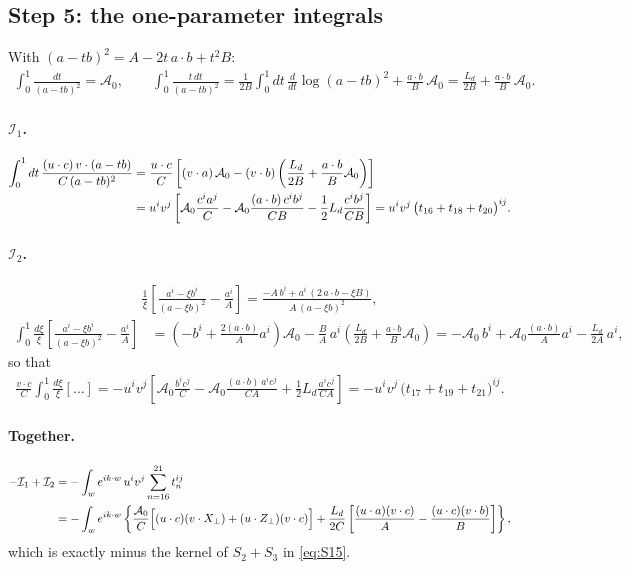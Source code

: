 \documentclass[10pt]{article}
\numberwithin{equation}{section}
\begin{document}
\subsection{Step 5: the one-parameter integrals}
With $(a-tb)^{2}=A-2t\,a\cdot b+t^{2}B$:
\begin{align}
\int_{0}^{1}\frac{dt}{(a-tb)^{2}}=\mathcal{A}_{0},\qquad
\int_{0}^{1}\frac{t\,dt}{(a-tb)^{2}}=\frac{1}{2B}\int_{0}^{1}dt\,\frac{d}{dt}\log(a-tb)^{2}+\frac{a\cdot b}{B}\,\mathcal{A}_{0}=\frac{L_{d}}{2B}+\frac{a\cdot b}{B}\,\mathcal{A}_{0}.
\end{align}
\paragraph{$\mathcal{I}_{1}$.}
\begin{align}
\int_{0}^{1}dt\,\frac{(u\cdot c)\,v\cdot(a-tb)}{C\,(a-tb)^{2}}
&=\frac{u\cdot c}{C}\left[(v\cdot a)\,\mathcal{A}_{0}-(v\cdot b)\left(\frac{L_{d}}{2B}+\frac{a\cdot b}{B}\mathcal{A}_{0}\right)\right]\notag\\
&=u^{i}v^{j}\left[\mathcal{A}_{0}\frac{c^{i}a^{j}}{C}-\mathcal{A}_{0}\frac{(a\cdot b)\,c^{i}b^{j}}{CB}-\frac12L_{d}\frac{c^{i}b^{j}}{CB}\right]=u^{i}v^{j}\,\big(t_{16}+t_{18}+t_{20}\big)^{ij}.
\end{align}
\paragraph{$\mathcal{I}_{2}$.}
\begin{align}
\frac1\xi\left[\frac{a^{i}-\xi b^{i}}{(a-\xi b)^{2}}-\frac{a^{i}}{A}\right]
=\frac{-A\,b^{i}+a^{i}\,(2\,a\cdot b-\xi B)}{A\,(a-\xi b)^{2}},
\end{align}
\begin{align}
\int_{0}^{1}\frac{d\xi}{\xi}\left[\frac{a^{i}-\xi b^{i}}{(a-\xi b)^{2}}-\frac{a^{i}}{A}\right]
&=\left(-b^{i}+\frac{2(a\cdot b)}{A}a^{i}\right)\mathcal{A}_{0}-\frac{B}{A}\,a^{i}\left(\frac{L_{d}}{2B}+\frac{a\cdot b}{B}\mathcal{A}_{0}\right)
=-\mathcal{A}_{0}\,b^{i}+\mathcal{A}_{0}\frac{(a\cdot b)}{A}a^{i}-\frac{L_{d}}{2A}\,a^{i},
\end{align}
so that
\begin{align}
\frac{v\cdot c}{C}\int_{0}^{1}\frac{d\xi}{\xi}[\dots]=-u^{i}v^{j}\left[\mathcal{A}_{0}\frac{b^{i}c^{j}}{C}-\mathcal{A}_{0}\frac{(a\cdot b)\,a^{i}c^{j}}{CA}+\frac12L_{d}\frac{a^{i}c^{j}}{CA}\right]=-u^{i}v^{j}\,\big(t_{17}+t_{19}+t_{21}\big)^{ij}.
\end{align}
\paragraph{Together.}
\begin{align}
-\mathcal{I}_{1}+\mathcal{I}_{2}&=-\int_{w}e^{ik\cdot w}\,u^{i}v^{j}\sum_{n=16}^{21}t_{n}^{ij}\notag\\
&=-\int_{w}e^{ik\cdot w}\left\{\frac{\mathcal{A}_{0}}{C}\Big[(u\cdot c)(v\cdot X_{\perp})+(u\cdot Z_{\perp})(v\cdot c)\Big]+\frac{L_{d}}{2C}\left[\frac{(u\cdot a)(v\cdot c)}{A}-\frac{(u\cdot c)(v\cdot b)}{B}\right]\right\},
\end{align}
which is exactly minus the kernel of $S_{2}+S_{3}$ in \eqref{eq:S15}.
\end{document}
